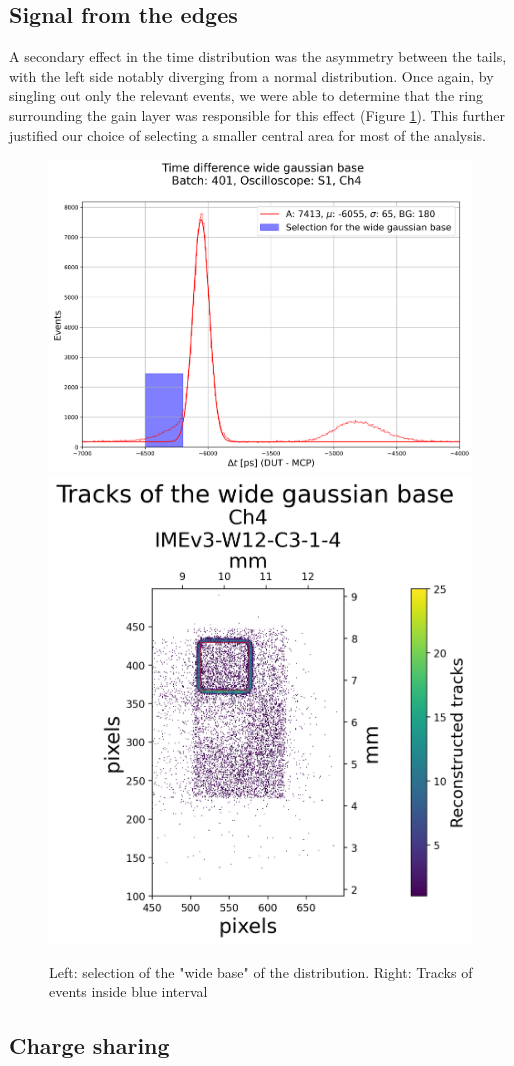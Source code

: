 \subsection{Signal from the edges}\label{sec:deviations_from_gaussian}
A secondary effect in the time distribution was the asymmetry between the tails, with the left side notably diverging from a normal distribution. Once again, by singling out only the relevant events, we were able to determine that the ring surrounding the gain layer was responsible for this effect (Figure \ref{fig:time_difference_wide_gaussian}). This further justified our choice of selecting a smaller central area for most of the analysis.

\begin{figure}[!ht]
    \centering
    \includegraphics[width=.55\linewidth]{Images/detailed_analysis/time_difference_401_S1_dut_3_with_wide gaussian_left.png}
    \hfill
    \includegraphics[width=.43\linewidth]{Images/detailed_analysis/2D Tracks 401_S1_dut_3_with_wide_gaussian_base_left.png}
    \caption{Left: selection of the "wide base" of the distribution.
    Right: Tracks of events inside blue interval}
    \label{fig:time_difference_wide_gaussian}
\end{figure}


\subsection{Charge sharing}


